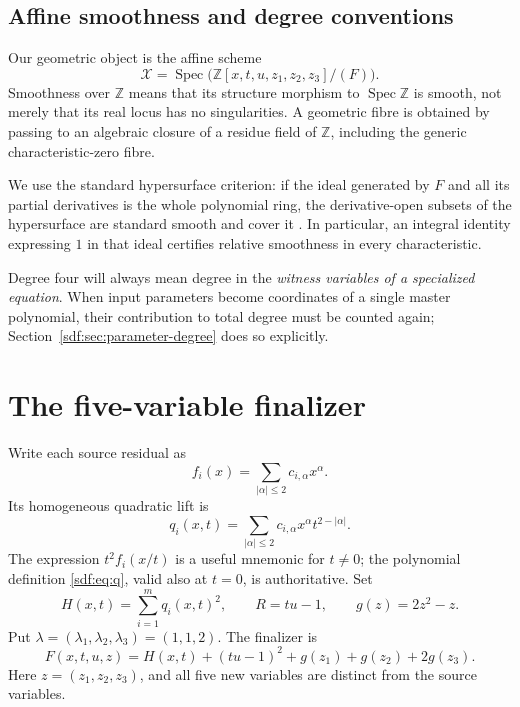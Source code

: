\documentclass[11pt,a4paper]{article}
\theoremstyle{definition}
\theoremstyle{remark}
\newcommand{\Z}{\mathbb Z}
\newcommand{\Spec}{\operatorname{Spec}}
\newcommand{\guard}{g}
\newcommand{\variety}{\mathcal X}
\begin{document}
\subsection{Affine smoothness and degree conventions}

Our geometric object is the affine scheme
\[
 \variety=\Spec\bigl(\Z[x,t,u,z_1,z_2,z_3]/(F)\bigr).
\]
Smoothness over $\Z$ means that its structure morphism to $\Spec\Z$ is
smooth, not merely that its real locus has no singularities. A geometric
fibre is obtained by passing to an algebraic closure of a residue field of
$\Z$, including the generic characteristic-zero fibre.

We use the standard hypersurface criterion: if the ideal generated by $F$
and all its partial derivatives is the whole polynomial ring, the
derivative-open subsets of the hypersurface are standard smooth and cover
it \cite{stacks}. In particular, an integral identity expressing $1$ in that
ideal certifies relative smoothness in every characteristic.

Degree four will always mean degree in the \emph{witness variables of a
specialized equation}. When input parameters become coordinates of a single
master polynomial, their contribution to total degree must be counted again;
Section~\ref{sdf:sec:parameter-degree} does so explicitly.

\section{The five-variable finalizer}\label{sdf:sec:main}

Write each source residual as
\[
 f_i(x)=\sum_{|\alpha|\le2}c_{i,\alpha}x^\alpha.
\]
Its homogeneous quadratic lift is
\begin{equation}\label{sdf:eq:q}
 q_i(x,t)=\sum_{|\alpha|\le2}c_{i,\alpha}x^\alpha t^{2-|\alpha|}.
\end{equation}
The expression $t^2 f_i(x/t)$ is a useful mnemonic for $t\ne0$; the
polynomial definition \eqref{sdf:eq:q}, valid also at $t=0$, is authoritative.
Set
\begin{equation}\label{sdf:eq:ingredients}
 H(x,t)=\sum_{i=1}^m q_i(x,t)^2,\qquad
 R=tu-1,\qquad \guard(z)=2z^2-z.
\end{equation}
Put $\lambda=(\lambda_1,\lambda_2,\lambda_3)=(1,1,2)$. The finalizer is
\begin{equation}\boxed{\displaystyle
 F(x,t,u,z)=H(x,t)+(tu-1)^2+
             \guard(z_1)+\guard(z_2)+2\guard(z_3).}\label{sdf:eq:F}
\end{equation}
Here $z=(z_1,z_2,z_3)$, and all five new variables are distinct from the
source variables.
\end{document}
